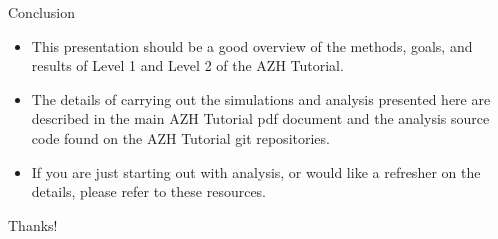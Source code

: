 \documentclass{beamer}
\begin{document}
	\begin{frame}{Conclusion}
		\begin{itemize}
\item<1->This presentation should be a good overview of the methods, goals, and results of Level 1 and Level 2 of the AZH Tutorial.

\bigskip

\item<1->The details of carrying out the simulations and analysis presented here are described in the main AZH Tutorial pdf document and the analysis source code found on the AZH Tutorial git repositories.

\bigskip

\item<1->If you are just starting out with analysis, or would like a refresher on the details, please refer to these resources.
		\end{itemize}
\bigskip

Thanks!
	\end{frame}
\end{document}
